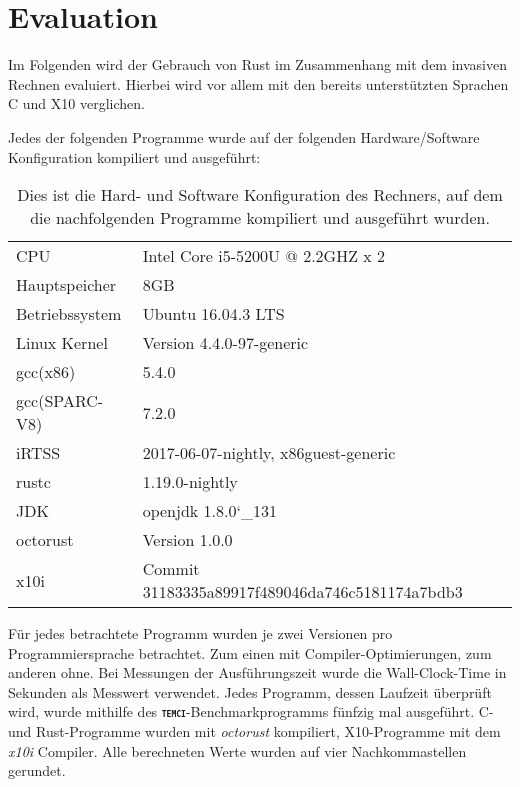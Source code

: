 \chapter{Evaluation}\label{sec:eval}

Im Folgenden wird der Gebrauch von Rust im Zusammenhang mit dem invasiven Rechnen evaluiert. Hierbei
wird vor allem mit den bereits unterstützten Sprachen C und X10 verglichen.

Jedes der folgenden Programme wurde auf der folgenden Hardware/Software Konfiguration kompiliert und ausgeführt:

\begin{table}[hb]
	\begin{center}
		\begin{tabular}{ll}
			\midrule
			CPU & Intel Core i5-5200U @ 2.2GHZ x 2 \\
			Hauptspeicher & 8GB \\
			Betriebssystem & Ubuntu 16.04.3 LTS \\
			Linux Kernel & Version 4.4.0-97-generic \\
			gcc(x86) & 5.4.0 \\
			gcc(SPARC-V8) & 7.2.0 \\
			iRTSS & 2017-06-07-nightly, x86guest-generic \\
			rustc & 1.19.0-nightly \\
			JDK & openjdk 1.8.0\char`_131 \\
			octorust & Version 1.0.0 \\
			x10i & Commit 31183335a89917f489046da746c5181174a7bdb3 \\
			\bottomrule
		\end{tabular}
	\end{center}
	\caption{
		Dies ist die Hard- und Software Konfiguration des Rechners,
		auf dem die nachfolgenden Programme kompiliert und ausgeführt wurden.
	}
	\label{fig:specs_table}
\end{table}

Für jedes betrachtete Programm wurden je zwei Versionen pro Programmiersprache betrachtet.
Zum einen mit Compiler-Optimierungen,
zum anderen ohne. Bei Messungen der Ausführungszeit wurde die Wall-Clock-Time in Sekunden als Messwert verwendet.
Jedes Programm, dessen Laufzeit
überprüft wird, wurde mithilfe des \texttt{\textsc{\textbf{temci}}}-Benchmarkprogramms fünfzig mal ausgeführt.
C- und Rust-Programme wurden mit \textit{octorust} kompiliert, X10-Programme mit dem \textit{x10i} Compiler.
Alle berechneten Werte wurden auf vier Nachkommastellen gerundet.

